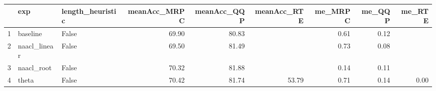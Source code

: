 \begin{table}[ht]
\centering
\begin{tabular}{rllrrrrrr}
  \hline
 & exp & length\_heuristic & meanAcc\_MRPC & meanAcc\_QQP & meanAcc\_RTE & me\_MRPC & me\_QQP & me\_RTE \\ 
  \hline
1 & baseline & False & 69.90 & 80.83 &  & 0.61 & 0.12 &  \\ 
  2 & naacl\_linear & False & 69.50 & 81.49 &  & 0.73 & 0.08 &  \\ 
  3 & naacl\_root & False & 70.32 & 81.88 &  & 0.14 & 0.11 &  \\ 
  4 & theta & False & 70.42 & 81.74 & 53.79 & 0.71 & 0.14 & 0.00 \\ 
   \hline
\end{tabular}
\end{table}
